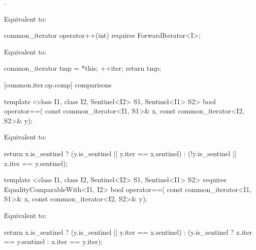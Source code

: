 \begin{itemdescr}
\pnum
\requires {}.

\pnum
\effects Equivalent to: 
\end{itemdescr}

\begin{itemdecl}
common_iterator operator++(int)
  requires ForwardIterator<I>;
\end{itemdecl}

\begin{itemdescr}
\pnum
\requires {}

\pnum
\effects Equivalent to:
\begin{codeblock}
common_iterator tmp = *this;
++iter;
return tmp;
\end{codeblock}
\end{itemdescr}

[common.iter.op.comp]{ comparisons}

%
%
\begin{itemdecl}
template <class I1, class I2, Sentinel<I2> S1, Sentinel<I1> S2>
bool operator==(
  const common_iterator<I1, S1>& x, const common_iterator<I2, S2>& y);
\end{itemdecl}

\begin{itemdescr}
\pnum
\effects Equivalent to:
\begin{codeblock}
  return x.is_sentinel ?
    (y.is_sentinel || y.iter == x.sentinel) :
    (!y.is_sentinel || x.iter == y.sentinel);
\end{codeblock}
\end{itemdescr}

%
%
\begin{itemdecl}
template <class I1, class I2, Sentinel<I2> S1, Sentinel<I1> S2>
  requires EqualityComparableWith<I1, I2>
bool operator==(
  const common_iterator<I1, S1>& x, const common_iterator<I2, S2>& y);
\end{itemdecl}

\begin{itemdescr}
\pnum
\effects Equivalent to:
\begin{codeblock}
  return x.is_sentinel ?
    (y.is_sentinel || y.iter == x.sentinel) :
    (y.is_sentinel ?
        x.iter == y.sentinel :
        x.iter == y.iter);
\end{codeblock}
\end{itemdescr}

